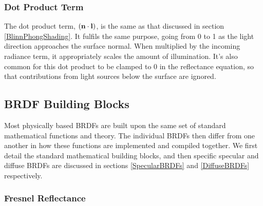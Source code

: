 \subsubsection{Dot Product Term}

The dot product term, \begin{math}(\mathbf{n}\cdot\mathbf{l})\end{math}, is the same as that discussed in section \ref{BlinnPhongShading}. It fulfils the same purpose, going from 0 to 1 as the light direction approaches the surface normal. When multiplied by the incoming radiance term, it appropriately scales the amount of illumination. It's also common for this dot product to be clamped to 0 in the reflectance equation, so that contributions from light sources below the surface are ignored.

\subsection{BRDF Building Blocks} \label{BRDFBuildingBlocks}

Most physically based BRDFs are built upon the same set of standard mathematical functions and theory. The individual BRDFs then differ from one another in how these functions are implemented and compiled together. We first detail the standard mathematical building blocks, and then specific specular and diffuse BRDFs are discussed in sections \ref{SpecularBRDFs} and \ref{DiffuseBRDFs} respectively.

\subsubsection{Fresnel Reflectance} \label{FresnelReflectance}

